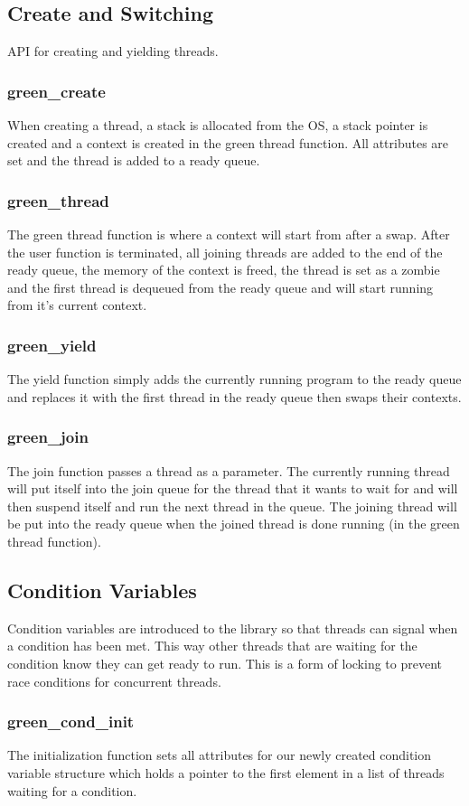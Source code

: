 \documentclass[12pt]{article}
\begin{document}
\subsection{Create and Switching}
API for creating and yielding threads.
\subsubsection{green\_create}
When creating a thread, a stack is allocated from the OS, a stack pointer is created and a context is created in the green thread function. All attributes are set and the thread is added to a ready queue.
\subsubsection{green\_thread}
The green thread function is where a context will start from after a swap. After the user function is terminated, all joining threads are added to the end of the ready queue, the memory of the context is freed, the thread is set as a zombie and the first thread is dequeued from the ready queue and will start running from it's current context.
\subsubsection{green\_yield}
The yield function simply adds the currently running program to the ready queue and replaces it with the first thread in the ready queue then swaps their contexts.
\subsubsection{green\_join}
The join function passes a thread as a parameter. The currently running thread will put itself into the join queue for the thread that it wants to wait for and will then suspend itself and run the next thread in the queue. The joining thread will be put into the ready queue when the joined thread is done running (in the green thread function).
\subsection{Condition Variables}
Condition variables are introduced to the library so that threads can signal when a condition has been met. This way other threads that are waiting for the condition know they can get ready to run. This is a form of locking to prevent race conditions for concurrent threads.
\subsubsection{green\_cond\_init}
The initialization function sets all attributes for our newly created condition variable structure which holds a pointer to the first element in a list of threads waiting for a condition.
\end{document}
